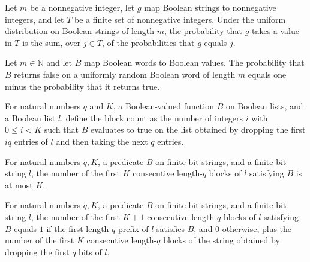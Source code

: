 \begin{theorem}
\label{Randomized.randProb_mem_eq_sum}
\leanok
{}
Let $m$ be a nonnegative integer, let $g$ map Boolean strings to nonnegative integers,
and let $T$ be a finite set of nonnegative integers. Under the uniform distribution on
Boolean strings of length $m$, the probability that $g$ takes a value in $T$ is the sum,
over $j\in T$, of the probabilities that $g$ equals $j$.
\end{theorem}

\begin{theorem}
\label{Randomized.randProb_bool_false}
\leanok
{}
Let $m\in\mathbb{N}$ and let $B$ map Boolean words to Boolean values. The probability
that $B$ returns false on a uniformly random Boolean word of length $m$ equals one minus
the probability that it returns true.
\end{theorem}

\begin{definition}
\label{Randomized.blockCount}
\leanok
For natural numbers $q$ and $K$, a Boolean-valued function $B$ on Boolean lists, and a
Boolean list $l$, define the block count as the number of integers $i$ with $0 \le i <
K$ such that $B$ evaluates to true on the list obtained by dropping the first $iq$
entries of $l$ and then taking the next $q$ entries.
\end{definition}

\begin{theorem}
\label{Randomized.blockCount_le}
\leanok
{}
For natural numbers $q,K$, a predicate $B$ on finite bit strings, and a finite bit
string $l$, the number of the first $K$ consecutive length-$q$ blocks of $l$ satisfying
$B$ is at most $K$.
\end{theorem}

\begin{theorem}
\label{Randomized.blockCount_succ}
\leanok
{}
For natural numbers $q,K$, a predicate $B$ on finite bit strings, and a finite bit
string $l$, the number of the first $K+1$ consecutive length-$q$ blocks of $l$
satisfying $B$ equals $1$ if the first length-$q$ prefix of $l$ satisfies $B$, and $0$
otherwise, plus the number of the first $K$ consecutive length-$q$ blocks of the string
obtained by dropping the first $q$ bits of $l$.
\end{theorem}

